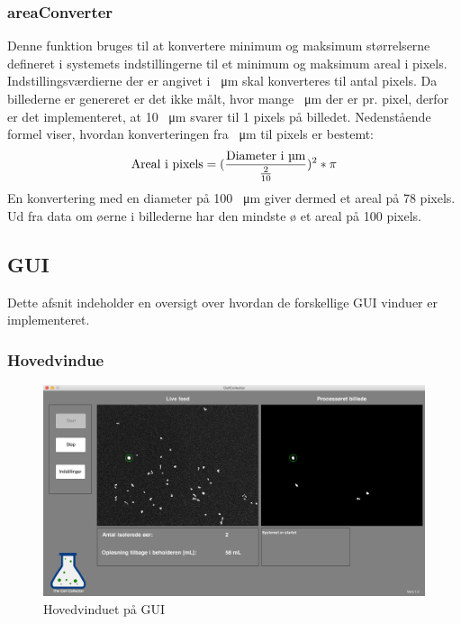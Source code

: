 \subsubsection{areaConverter}
Denne funktion bruges til at konvertere minimum og maksimum størrelserne defineret i systemets indstillingerne til et minimum og maksimum areal i pixels.  Indstillingsværdierne der er angivet i \SI{}{\micro\meter} skal konverteres til antal pixels. Da billederne er genereret er det ikke målt, hvor mange \SI{}{\micro\meter} der er pr. pixel, derfor er det implementeret, at 10 \SI{}{\micro\meter} svarer til 1 pixels på billedet. Nedenstående formel viser, hvordan konverteringen fra \SI{}{\micro\meter} til pixels er bestemt: 
\begin{align}
\text{Areal i pixels} = (\frac{\text{Diameter i \SI{}{\micro\meter}}}{\frac{2}{10}})^2*\pi
\end{align}
En konvertering med en diameter på 100 \SI{}{\micro\meter} giver dermed et areal på 78 pixels. Ud fra data om øerne i billederne har den mindste ø et areal på 100 pixels.  

\newpage
\subsection{GUI}
Dette afsnit indeholder en oversigt over hvordan de forskellige GUI vinduer er implementeret.
\subsubsection{Hovedvindue}
\begin{figure}[H]
	\centering
	\includegraphics[width=1\textwidth]{billeder/software/gui_main.png}
	\caption{Hovedvinduet på GUI}
	\label{fig:finishedGUI}
\end{figure}

